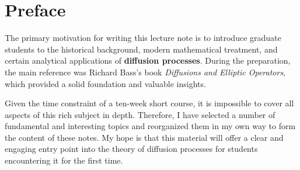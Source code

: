 %

\chapter*{Preface}

The primary motivation for writing this lecture note is to introduce graduate students to the historical background, modern mathematical treatment, and certain analytical applications of {\bf diffusion processes}.  During the preparation, the main reference was Richard Bass's book {\em Diffusions and Elliptic Operators}, which provided a solid foundation and valuable insights.

Given the time constraint of a ten-week short course, it is impossible to cover all aspects of this rich subject in depth. Therefore, I have selected a number of fundamental and interesting topics and reorganized them in my own way to form the content of these notes. My hope is that this material will offer a clear and engaging entry point into the theory of diffusion processes for students encountering it for the first time.


